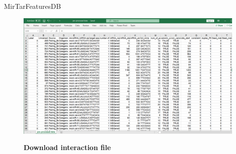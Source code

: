 \documentclass{beamer}
\begin{document}
\begin{frame}{MirTarFeaturesDB}



\begin{figure}[h!]
  \caption{\textbf{Download interaction file}}
      \includegraphics[width = 1\textwidth]{db figures/download.png}
      \label{fig:download}
          \end{figure}
\end{frame}






\end{document}
